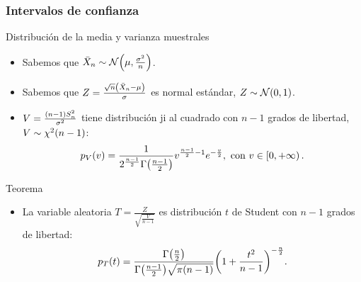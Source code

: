 \documentclass[table]{beamer}
\begin{document}
\begin{frame}
    \frametitle{Intervalos de confianza}
    \begin{block}{Distribución de la media y varianza muestrales}
        \begin{itemize}
            \item Sabemos que $\bar{X}_{n} \sim \normal{\mu}{\frac{\sigma^{2}}{n}}$.
            \item Sabemos que $Z = \frac{\sqrt{n} \parens{\bar{X}_{n} - \mu}}{\sigma}$ es normal estándar, $Z \sim \normal{0}{1}$.
            \item $V =  \frac{\parens{n - 1} S^{2}_{n}}{\sigma^{2}}$ tiene distribución ji al cuadrado con $n - 1$ grados de libertad, $V \sim \chidist{n - 1}$:
                \begin{equation*}
                    \ppdf{V}{v} = \frac{1}{2^{\frac{n - 1}{2}} \gammafunc{\frac{n - 1}{2}}} v^{\frac{n - 1}{2} - 1} e^{- \frac{v}{2}} ,
                    \text{ con } v \in \left [ 0 , + \infty \right ) .
                \end{equation*}
        \end{itemize}
    \end{block}
    \begin{block}{Teorema}
        \begin{itemize}
            \item La variable aleatoria $T = \frac{Z}{\sqrt{\frac{V}{n - 1}}}$ es distribución $t$ de Student con $n - 1$ grados de libertad:
                \begin{equation*}
                    \ppdf{T}{t} = \frac{\gammafunc{\frac{n}{2}}}{\gammafunc{\frac{n - 1}{2}} \sqrt{\pi \parens{n - 1}}} \parens{1 + \frac{t^{2}}{n - 1}}^{- \frac{n}{2}} .
                \end{equation*}
        \end{itemize}
    \end{block}
\end{frame}
\end{document}
